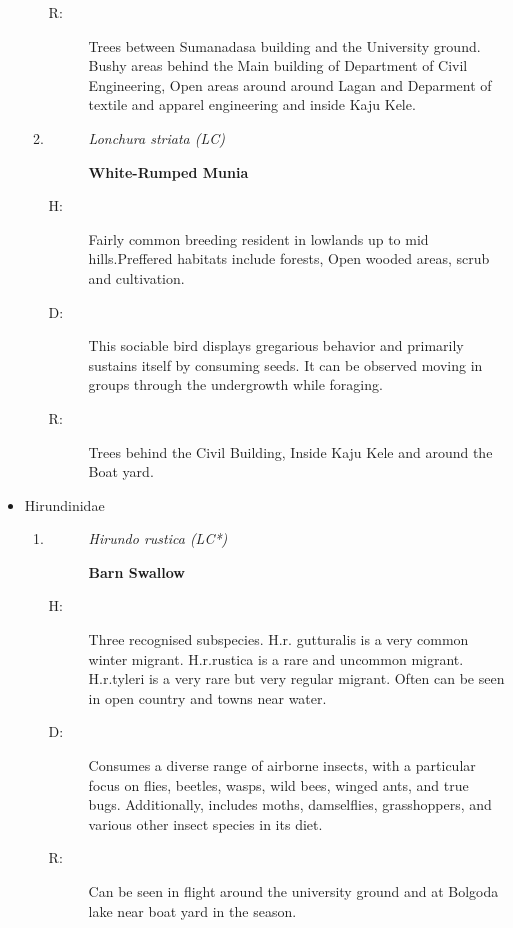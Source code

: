 \begin{itemize}
\begin{enumerate}
\begin{description}
\item[R: ]%
Trees between Sumanadasa building and the University ground. Bushy areas behind the Main building of Department of Civil Engineering, Open areas around around Lagan and Deparment of textile and apparel engineering and inside Kaju Kele.%
\end{description}%
\item%
\begin{description}%
\item[]%
\textit{Lonchura striata (LC)}%
\item[]%
\textbf{White{-}Rumped Munia}%
\end{description}%
\begin{description}%
\item[H: ]%
Fairly common breeding resident in lowlands up to mid hills.Preffered habitats include forests, Open wooded areas, scrub and cultivation.%
\item[D: ]%
This sociable bird displays gregarious behavior and primarily sustains itself by consuming seeds. It can be observed moving in groups through the undergrowth while foraging.%
\item[R: ]%
Trees behind the Civil Building, Inside Kaju Kele and around the Boat yard.%
\end{description}%
\end{enumerate}%
\item%
Hirundinidae%
\begin{enumerate}%
\item%
\begin{description}%
\item[]%
\textit{Hirundo rustica (LC*)}%
\item[]%
\textbf{Barn Swallow}%
\end{description}%
\begin{description}%
\item[H: ]%
Three recognised subspecies. H.r. gutturalis is a very common winter migrant. H.r.rustica is a rare and uncommon migrant. H.r.tyleri is a very rare but very regular migrant. Often can be seen in open country and towns near water.%
\item[D: ]%
Consumes a diverse range of airborne insects, with a particular focus on flies, beetles, wasps, wild bees, winged ants, and true bugs. Additionally, includes moths, damselflies, grasshoppers, and various other insect species in its diet.%
\item[R: ]%
Can be seen in flight around the university ground and at Bolgoda lake near boat yard in the season.%

\end{description}
\end{enumerate}
\end{itemize}
